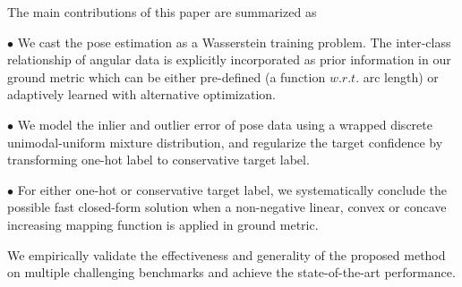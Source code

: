 The main contributions of this paper are summarized as

$\bullet$ We cast the pose estimation as a Wasserstein training problem. The inter-class relationship of angular data is explicitly incorporated as prior information in our ground metric which can be either pre-defined (a function $w.r.t.$ arc length) or adaptively learned with alternative optimization. 


$\bullet$ We model the inlier and outlier error of pose data using a wrapped discrete unimodal-uniform mixture distribution, and regularize the target confidence by transforming one-hot label to conservative target label.


$\bullet$ For either one-hot or conservative target label, we systematically conclude the possible fast closed-form solution when a non-negative linear, convex or concave increasing mapping function is applied in ground metric.  

We empirically validate the effectiveness and generality of the proposed method on multiple challenging benchmarks and achieve the state-of-the-art performance.

